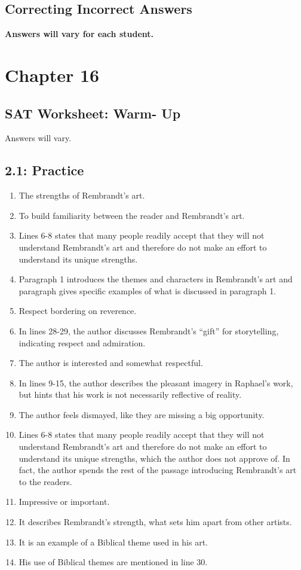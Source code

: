 \begin{enumerate}
\subsection{Correcting Incorrect Answers}
\textbf{Answers will vary for each student.}



\vfill
\newpage
\section{Chapter 16}

\subsection{SAT Worksheet: Warm- Up}

Answers will vary.

\subsection{2.1: Practice}

\begin{enumerate}
\item The strengths of Rembrandt's art.
\item To build familiarity between the reader and Rembrandt's art.
\item Lines 6-8 states that many people readily accept that they will not understand Rembrandt's art and therefore do not make an effort to understand its unique strengths. 
\item Paragraph 1 introduces the themes and characters in Rembrandt's art and paragraph gives specific examples of what is discussed in paragraph 1.
\item Respect bordering on reverence. 
\item In lines 28-29, the author discusses Rembrandt's ``gift'' for storytelling, indicating respect and admiration. 
\item The author is interested and somewhat respectful.
\item In lines 9-15, the author describes the pleasant imagery in Raphael's work, but hints that his work is not necessarily reflective of reality. 
\item The author feels dismayed, like they are missing a big opportunity. 
\item Lines 6-8 states that many people readily accept that they will not understand Rembrandt's art and therefore do not make an effort to understand its unique strengths, which the author does not approve of. In fact, the author spends the rest of the passage introducing Rembrandt's art to the readers.
\item Impressive or important.
\item It describes Rembrandt's strength, what sets him apart from other artists. 
\item It is an example of a Biblical theme used in his art.
\item His use of Biblical themes are mentioned in line 30.
\end{enumerate}


\end{enumerate}
